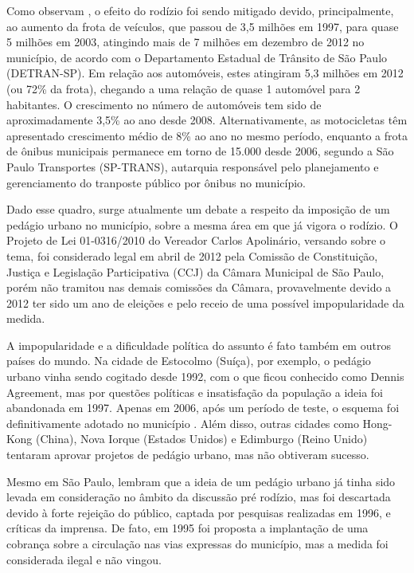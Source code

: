 \documentclass[
	12pt,				%
	openright,			%
	twoside,			%
	a4paper,			%
	english,			%
	french,				%
	spanish,			%
	brazil,				%
	]{abntex2}
\begin{document}
Como observam \cite{Camara2004}, o efeito do rodízio foi sendo mitigado devido, principalmente, ao aumento da frota de veículos, que passou de 3,5 milhões em 1997, para quase 5 milhões em 2003, atingindo mais de 7 milhões em dezembro de 2012 no município, de acordo com o Departamento Estadual de Trânsito de São Paulo (DETRAN-SP). Em relação aos automóveis, estes atingiram 5,3 milhões em 2012 (ou 72\% da frota), chegando a uma relação de quase 1 automóvel para 2 habitantes. O crescimento no número de automóveis tem sido de aproximadamente 3,5\% ao ano desde 2008. Alternativamente, as motocicletas têm apresentado crescimento médio de 8\% ao ano no mesmo período, enquanto a frota de ônibus municipais permanece em torno de 15.000 desde 2006, segundo a São Paulo Transportes (SP-TRANS), autarquia responsável pelo planejamento e gerenciamento do tranposte público por ônibus no município.

Dado esse quadro, surge atualmente um debate a respeito da imposição de um pedágio urbano no município, sobre a mesma área em que já vigora o rodízio. O Projeto de Lei 01-0316/2010 do Vereador Carlos Apolinário, versando sobre o tema, foi considerado legal em abril de 2012 pela Comissão de Constituição, Justiça e Legislação Participativa (CCJ) da Câmara Municipal de São Paulo, porém não tramitou nas demais comissões da Câmara, provavelmente devido a 2012 ter sido um ano de eleições e pelo receio de uma possível impopularidade da medida.

A impopularidade e a dificuldade política do assunto é fato também em outros países do mundo. Na cidade de Estocolmo (Suíça), por exemplo, o pedágio urbano vinha sendo cogitado desde 1992, com o que ficou conhecido como Dennis Agreement, mas por questões políticas e insatisfação da população a ideia foi abandonada em 1997. Apenas em 2006, após um período de teste, o esquema foi definitivamente adotado no município \cite{Eliasson2008}. Além disso, outras cidades como Hong-Kong (China),  Nova Iorque (Estados Unidos) e Edimburgo (Reino Unido) tentaram aprovar projetos de pedágio urbano, mas não obtiveram sucesso.

Mesmo em São Paulo, \cite{Camara2004} lembram que a ideia de um pedágio urbano já tinha sido levada em consideração no âmbito da discussão pré rodízio, mas foi descartada devido à forte rejeição do público, captada por pesquisas realizadas em 1996, e críticas da imprensa. De fato, em 1995 foi proposta a implantação de uma cobrança sobre a circulação nas vias expressas do município, mas a medida foi considerada ilegal e não vingou.
\end{document}
